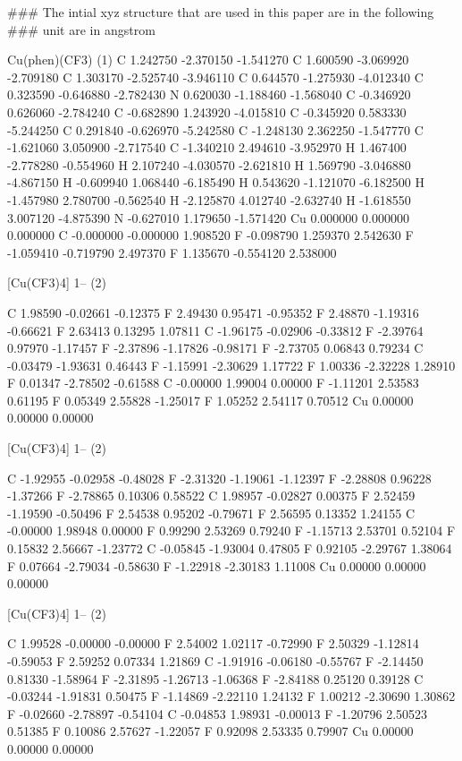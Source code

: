 ### The intial xyz structure that are used in this paper are in the following 
### unit are in angstrom



Cu(phen)(CF3) (1)
C 1.242750 -2.370150 -1.541270
 C 1.600590 -3.069920 -2.709180
 C 1.303170 -2.525740 -3.946110
 C 0.644570 -1.275930 -4.012340
 C 0.323590 -0.646880 -2.782430
 N 0.620030 -1.188460 -1.568040
 C -0.346920 0.626060 -2.784240
 C -0.682890 1.243920 -4.015810
 C -0.345920 0.583330 -5.244250
 C 0.291840 -0.626970 -5.242580
 C -1.248130 2.362250 -1.547770
 C -1.621060 3.050900 -2.717540
 C -1.340210 2.494610 -3.952970
 H 1.467400 -2.778280 -0.554960
 H 2.107240 -4.030570 -2.621810
 H 1.569790 -3.046880 -4.867150
 H -0.609940 1.068440 -6.185490
 H 0.543620 -1.121070 -6.182500
 H -1.457980 2.780700 -0.562540
 H -2.125870 4.012740 -2.632740
 H -1.618550 3.007120 -4.875390
 N -0.627010 1.179650 -1.571420
 Cu 0.000000 0.000000 0.000000
 C -0.000000 -0.000000 1.908520
 F -0.098790 1.259370 2.542630
 F -1.059410 -0.719790 2.497370
 F 1.135670 -0.554120 2.538000


[Cu(CF3)4] 1– (2)

C 1.98590 -0.02661 -0.12375
F 2.49430 0.95471 -0.95352
F 2.48870 -1.19316 -0.66621
F 2.63413 0.13295 1.07811
C -1.96175 -0.02906 -0.33812
F -2.39764 0.97970 -1.17457
F -2.37896 -1.17826 -0.98171
F -2.73705 0.06843 0.79234
C -0.03479 -1.93631 0.46443
F -1.15991 -2.30629 1.17722
F 1.00336 -2.32228 1.28910
F 0.01347 -2.78502 -0.61588
C -0.00000 1.99004 0.00000
F -1.11201 2.53583 0.61195
F 0.05349 2.55828 -1.25017
F 1.05252 2.54117 0.70512
Cu 0.00000 0.00000 0.00000

[Cu(CF3)4]
1– (2)

C -1.92955 -0.02958 -0.48028
F -2.31320 -1.19061 -1.12397
F -2.28808 0.96228 -1.37266
F -2.78865 0.10306 0.58522
C 1.98957 -0.02827 0.00375
F 2.52459 -1.19590 -0.50496
F 2.54538 0.95202 -0.79671
F 2.56595 0.13352 1.24155
C -0.00000 1.98948 0.00000
F 0.99290 2.53269 0.79240
F -1.15713 2.53701 0.52104
F 0.15832 2.56667 -1.23772
C -0.05845 -1.93004 0.47805
F 0.92105 -2.29767 1.38064
F 0.07664 -2.79034 -0.58630
F -1.22918 -2.30183 1.11008
Cu 0.00000 0.00000 0.00000


[Cu(CF3)4]
1– (2)

C 1.99528 -0.00000 -0.00000
F 2.54002 1.02117 -0.72990
F 2.50329 -1.12814 -0.59053
F 2.59252 0.07334 1.21869
C -1.91916 -0.06180 -0.55767
F -2.14450 0.81330 -1.58964
F -2.31895 -1.26713 -1.06368
F -2.84188 0.25120 0.39128
C -0.03244 -1.91831 0.50475
F -1.14869 -2.22110 1.24132
F 1.00212 -2.30690 1.30862
F -0.02660 -2.78897 -0.54104
C -0.04853 1.98931 -0.00013
F -1.20796 2.50523 0.51385
F 0.10086 2.57627 -1.22057
F 0.92098 2.53335 0.79907
Cu 0.00000 0.00000 0.00000


